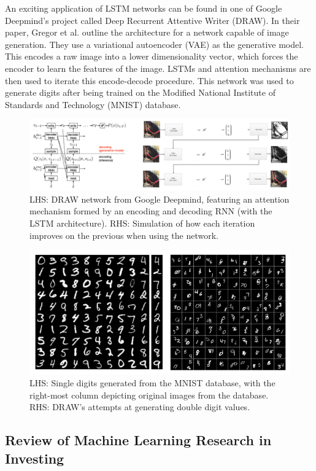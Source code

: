 \documentclass[10pt,onecolumn,letterpaper]{article}
\begin{document}
An exciting application of LSTM networks can be found in one of Google Deepmind's project called Deep Recurrent Attentive Writer (DRAW). In their paper\cite{Gregor}, Gregor et al. outline the architecture for a network capable of image generation. They use a variational autoencoder (VAE) as the generative model. This encodes a raw image into a lower dimensionality vector, which forces the encoder to learn the features of the image. LSTMs and attention mechanisms are then used to iterate this encode-decode procedure. This network was used to generate digits after being trained on the Modified National Institute of Standards and Technology (MNIST) database. 

\begin{figure}[!hbt!]
\centering
\includegraphics[width=14.5cm]{draw_network.png}
\caption{LHS: DRAW network from Google Deepmind, featuring an attention mechanism formed by an encoding and decoding RNN (with the LSTM architecture). RHS: Simulation of how each iteration improves on the previous when using the network.}
\end{figure}

\begin{figure}[!hbt!]
\centering
\includegraphics[width=12.5cm]{draw_results.png}
\caption{LHS: Single digits generated from the MNIST database, with the right-most column depicting original images from the database. RHS: DRAW's attempts at generating double digit values.}
\end{figure}

\subsection{Review of Machine Learning Research in Investing}  \label{ML_research}
\end{document}
